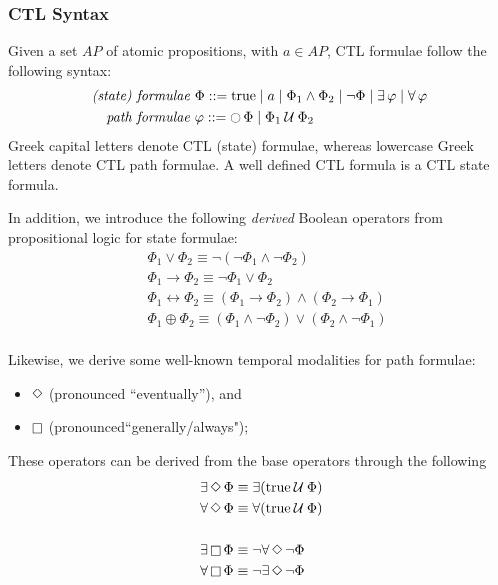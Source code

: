 \documentclass{article}
\begin{document}
\subsubsection*{CTL Syntax}
Given a set $AP$ of atomic propositions, with $a \in AP$, CTL formulae follow the following syntax: 
\begin{align*}
    \emph{(state) formulae } & \Phi ::= \text{true} \mid a \mid \Phi_1 \land \Phi_2 \mid \neg \Phi \mid \exists \, \varphi \mid \forall \, \varphi \\
    \emph{path formulae   }    & \varphi ::= \mathop{\ocircle}{\Phi} \mid \Phi_1 \mathbin{\mathcal{U}} \Phi_2 \\
\end{align*}
Greek capital letters denote CTL (state) formulae, whereas lowercase Greek letters denote CTL path formulae. 
A well defined CTL formula is a CTL state formula.

In addition, we introduce the following \emph{derived} Boolean operators from propositional logic for state formulae: 
\begin{align*}
    &\; \Phi_1 \lor \Phi_2 \equiv \neg (\neg \Phi_1 \land \neg \Phi_2) \\
    &\; \Phi_1 \rightarrow \Phi_2 \equiv \neg \Phi_1 \lor \Phi_2 \\
    &\; \Phi_1 \leftrightarrow  \Phi_2 \equiv (\Phi_1 \rightarrow \Phi_2) \land (\Phi_2 \rightarrow \Phi_1) \\
    &\; \Phi_1 \oplus  \Phi_2 \equiv (\Phi_1 \land \neg \Phi_2) \lor (\Phi_2 \land \neg \Phi_1)\\
\end{align*}

Likewise, we derive some well-known temporal modalities for path formulae: 
\begin{itemize}
    \item $\mathop{\Diamond}$ (pronounced ``eventually''), and
    \item $\mathop{\square}$ (pronounced``generally/always");
\end{itemize}

These operators can be derived from the base operators through the following
\begin{align*}
    &\; \exists \mathop{\Diamond} \Phi \equiv \exists(\text{true} \mathbin{\mathcal{U}} \Phi) \\ 
    &\; \forall \mathop{\Diamond} \Phi \equiv \forall(\text{true} \mathbin{\mathcal{U}} \Phi) \\ 
    &\; \\ 
    &\; \exists \mathop{\square} \Phi \equiv \neg\forall \mathop{\Diamond} \neg\Phi \\ 
    &\; \forall \mathop{\square} \Phi \equiv \neg\exists \mathop{\Diamond} \neg\Phi \\
\end{align*}
\end{document}
